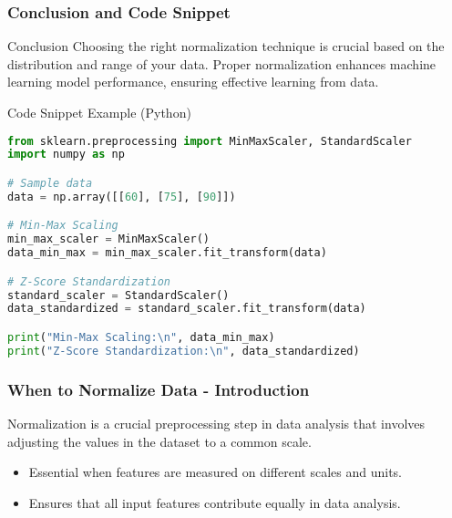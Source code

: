 \documentclass[aspectratio=169]{beamer}
\begin{document}
\begin{frame}[fragile]
    \frametitle{Conclusion and Code Snippet}
    \begin{block}{Conclusion}
        Choosing the right normalization technique is crucial based on the distribution and range of your data. Proper normalization enhances machine learning model performance, ensuring effective learning from data.
    \end{block}
    
    \begin{block}{Code Snippet Example (Python)}
        \begin{lstlisting}[language=Python]
from sklearn.preprocessing import MinMaxScaler, StandardScaler
import numpy as np

# Sample data
data = np.array([[60], [75], [90]])

# Min-Max Scaling
min_max_scaler = MinMaxScaler()
data_min_max = min_max_scaler.fit_transform(data)

# Z-Score Standardization
standard_scaler = StandardScaler()
data_standardized = standard_scaler.fit_transform(data)

print("Min-Max Scaling:\n", data_min_max)
print("Z-Score Standardization:\n", data_standardized)
        \end{lstlisting}
    \end{block}
\end{frame}

\begin{frame}[fragile]
    \frametitle{When to Normalize Data - Introduction}
    Normalization is a crucial preprocessing step in data analysis that involves adjusting the values in the dataset to a common scale. 
    \begin{itemize}
        \item Essential when features are measured on different scales and units.
        \item Ensures that all input features contribute equally in data analysis.
    \end{itemize}
\end{frame}
\end{document}
